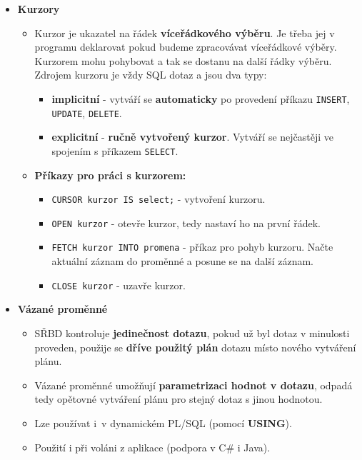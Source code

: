 \begin{itemize}
    \item\textbf{Kurzory}
          \begin{itemize}
              \item Kurzor je ukazatel na řádek \textbf{víceřádkového výběru}. Je třeba jej v programu deklarovat pokud budeme zpracovávat víceřádkové výběry. Kurzorem mohu pohybovat a tak se dostanu na další řádky výběru. Zdrojem kurzoru je vždy SQL dotaz a jsou dva typy:
                    \begin{itemize}
                        \item \textbf{implicitní} - vytváří se \textbf{automaticky} po provedení příkazu \texttt{INSERT}, \texttt{UPDATE}, \texttt{DELETE}.
                        \item \textbf{explicitní} - \textbf{ručně vytvořený kurzor}. Vytváří se nejčastěji ve spojením s příkazem \texttt{SELECT}.
                    \end{itemize}
              \item \textbf{Příkazy pro práci s kurzorem:}
                    \begin{itemize}
                        \item \texttt{CURSOR kurzor IS select;} - vytvoření kurzoru.
                        \item \texttt{OPEN kurzor} - otevře kurzor, tedy nastaví ho na první řádek.
                        \item \texttt{FETCH kurzor INTO promena} - příkaz pro pohyb kurzoru. Načte aktuální záznam do proměnné a posune se na další záznam.
                        \item \texttt{CLOSE kurzor} - uzavře kurzor.
                    \end{itemize}
          \end{itemize}


    \item\textbf{Vázané proměnné}
          \begin{itemize}
              \item SŘBD kontroluje \textbf{jedinečnost dotazu}, pokud už byl dotaz v minulosti proveden, použije se \textbf{dříve použitý plán} dotazu místo nového vytváření plánu.
              \item Vázané proměnné umožňují \textbf{parametrizaci hodnot v dotazu}, odpadá tedy opětovné vytváření plánu pro stejný dotaz s jinou hodnotou.
              \item Lze používat i v dynamickém PL/SQL (pomocí \textbf{USING}).
              \item Použití i při voláni z aplikace (podpora v C\# i Java).
          \end{itemize}




\end{itemize}
